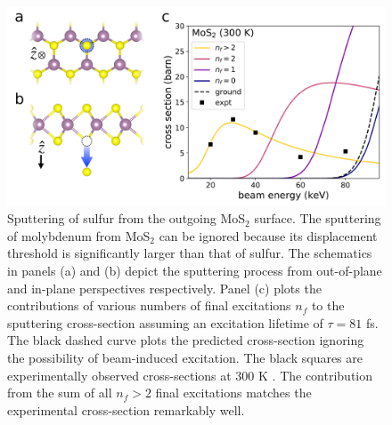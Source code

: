 \documentclass{article}
\begin{document}
\begin{figure}
  \centering
  \includegraphics[width=.95\textwidth]{fig6.pdf}
  \caption{
    Sputtering of sulfur from the outgoing MoS$_2$ surface.
    The sputtering of molybdenum from MoS$_2$ can be ignored because its
    displacement threshold is significantly larger than that of sulfur.
    The schematics in panels (a) and (b) depict the sputtering process from
    out-of-plane and in-plane perspectives respectively.
    Panel (c) plots the contributions of various numbers of final excitations
    $n_f$ to the sputtering cross-section assuming an excitation lifetime of
    $\tau=81$ fs.
    The black dashed curve plots the predicted cross-section ignoring the
    possibility of beam-induced excitation.
    The black squares are experimentally observed cross-sections at 300 K
    \cite{Kretschmer2020}.
    The contribution from the sum of all $n_f>2$ final excitations matches
    the experimental cross-section remarkably well.
  }
  \label{fig:MoS2Cross}
\end{figure}
\end{document}
